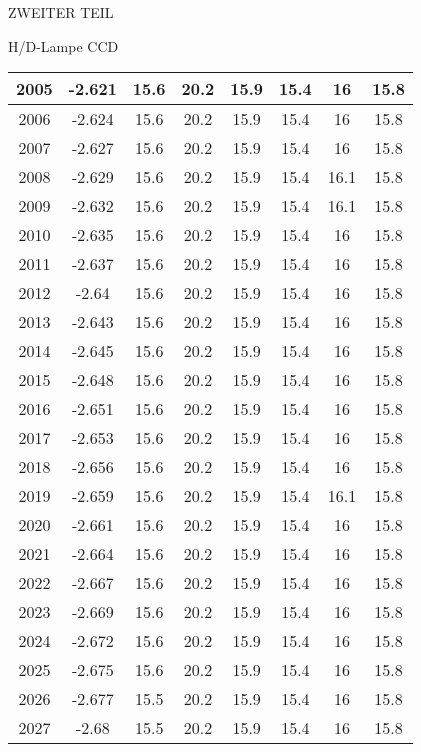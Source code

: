 \begin{appendix}
\begin{chapter}{ZWEITER TEIL}
\begin{section}{H/D-Lampe CCD}
\begin{scriptsize}
\begin{longtable}[htbp]{|c|c|c|c|c|c|c|c|}
            2005 & -2.621 & 15.6 & 20.2 & 15.9 & 15.4 & 16 & 15.8 \\ \hline
            2006 & -2.624 & 15.6 & 20.2 & 15.9 & 15.4 & 16 & 15.8 \\ \hline
            2007 & -2.627 & 15.6 & 20.2 & 15.9 & 15.4 & 16 & 15.8 \\ \hline
            2008 & -2.629 & 15.6 & 20.2 & 15.9 & 15.4 & 16.1 & 15.8 \\ \hline
            2009 & -2.632 & 15.6 & 20.2 & 15.9 & 15.4 & 16.1 & 15.8 \\ \hline
            2010 & -2.635 & 15.6 & 20.2 & 15.9 & 15.4 & 16 & 15.8 \\ \hline
            2011 & -2.637 & 15.6 & 20.2 & 15.9 & 15.4 & 16 & 15.8 \\ \hline
            2012 & -2.64 & 15.6 & 20.2 & 15.9 & 15.4 & 16 & 15.8 \\ \hline
            2013 & -2.643 & 15.6 & 20.2 & 15.9 & 15.4 & 16 & 15.8 \\ \hline
            2014 & -2.645 & 15.6 & 20.2 & 15.9 & 15.4 & 16 & 15.8 \\ \hline
            2015 & -2.648 & 15.6 & 20.2 & 15.9 & 15.4 & 16 & 15.8 \\ \hline
            2016 & -2.651 & 15.6 & 20.2 & 15.9 & 15.4 & 16 & 15.8 \\ \hline
            2017 & -2.653 & 15.6 & 20.2 & 15.9 & 15.4 & 16 & 15.8 \\ \hline
            2018 & -2.656 & 15.6 & 20.2 & 15.9 & 15.4 & 16 & 15.8 \\ \hline
            2019 & -2.659 & 15.6 & 20.2 & 15.9 & 15.4 & 16.1 & 15.8 \\ \hline
            2020 & -2.661 & 15.6 & 20.2 & 15.9 & 15.4 & 16 & 15.8 \\ \hline
            2021 & -2.664 & 15.6 & 20.2 & 15.9 & 15.4 & 16 & 15.8 \\ \hline
            2022 & -2.667 & 15.6 & 20.2 & 15.9 & 15.4 & 16 & 15.8 \\ \hline
            2023 & -2.669 & 15.6 & 20.2 & 15.9 & 15.4 & 16 & 15.8 \\ \hline
            2024 & -2.672 & 15.6 & 20.2 & 15.9 & 15.4 & 16 & 15.8 \\ \hline
            2025 & -2.675 & 15.6 & 20.2 & 15.9 & 15.4 & 16 & 15.8 \\ \hline
            2026 & -2.677 & 15.5 & 20.2 & 15.9 & 15.4 & 16 & 15.8 \\ \hline
            2027 & -2.68 & 15.5 & 20.2 & 15.9 & 15.4 & 16 & 15.8 \\ \hline

\end{longtable}
\end{scriptsize}
\end{section}
\end{chapter}
\end{appendix}
